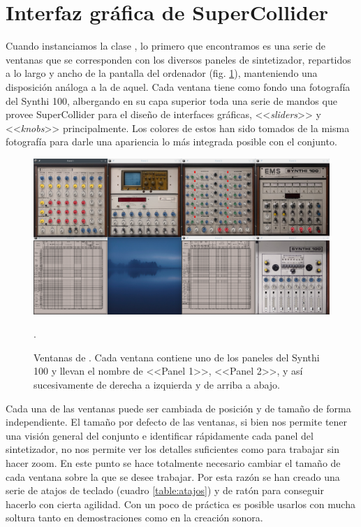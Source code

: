 \section[\textit{GUI} de SuperCollider]{Interfaz gráfica de SuperCollider }

Cuando instanciamos la clase \texttt{\className}, lo primero que encontramos es una serie de ventanas que se corresponden con los diversos paneles de sintetizador, repartidos a lo largo y ancho de la pantalla del ordenador (fig. \ref{fig:aspecto_SynthiGME}), manteniendo una disposición análoga a la de aquel. Cada ventana tiene como fondo una fotografía del Synthi 100, albergando en su capa superior toda una serie de mandos que provee SuperCollider para el diseño de interfaces gráficas, <<\textit{sliders}>> y <<\textit{knobs}>> principalmente. Los colores de estos han sido tomados de la misma fotografía para darle una apariencia lo más integrada posible con el conjunto. 

\begin{figure}
	\centering
	\includegraphics[width=1\textwidth]{images/todos_los_paneles}
	\caption[Ventanas de \appName]{Ventanas de \appName. Cada ventana contiene uno de los paneles del Synthi 100 y llevan el nombre de <<Panel 1>>, <<Panel 2>>, y así sucesivamente de derecha a izquierda y de arriba a abajo. }.
	\label{fig:aspecto_SynthiGME}
\end{figure}
	
Cada una de las ventanas puede ser cambiada de posición y de tamaño de forma independiente. El tamaño por defecto de las ventanas, si bien nos permite tener una visión general del conjunto e identificar rápidamente cada panel del sintetizador, no nos permite ver los detalles suficientes como para trabajar sin hacer zoom. En este punto se hace totalmente necesario cambiar el tamaño de cada ventana sobre la que se desee trabajar. Por esta razón se han creado una serie de atajos de teclado (cuadro \ref{table:atajos})  y de ratón para conseguir hacerlo con cierta agilidad. Con un poco de práctica es posible usarlos con mucha soltura tanto en demostraciones como en la creación sonora.
	

